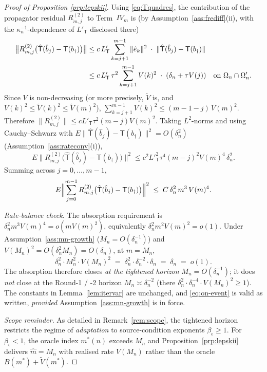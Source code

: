 \begin{proof}[Proof of Proposition \ref{prp:lepskii}]
Using \eqref{eq:Tquadres}, the contribution of the propagator residual
$R^{(2)}_{m,j}$ to Term~$IV_m$ is
(by Assumption~\ref{ass:frediff}\textup{(ii)}, with the
$\kappa_n^{-1}$-dependence of $L'_{\mathsf T}$ disclosed there)
\begin{align}
\bigl\|R^{(2)}_{m,j}\bigl(\hat{\mathsf T}(\hat b_j) - \mathsf T(b_\dagger)\bigr)\bigr\|
&\le c\,L'_{\mathsf T}\sum_{k=j+1}^{m-1}\|\hat e_k\|^{2}\;\cdot\;
   \|\hat{\mathsf T}(\hat b_j) - \mathsf T(b_\dagger)\|
   \notag\\
&\le c\,L'_{\mathsf T}\,\tau^{2}\sum_{k=j+1}^{m-1}V(k)^{2}\;\cdot\;
   (\delta_n + \tau V(j))
\quad\text{on $\Omega_n \cap \Omega'_n$.}
   \label{eq:Rabsorb-piece}
\end{align}
Since $V$ is non-decreasing (or more precisely, $\tilde V$ is, and
$V(k)^2 \le \tilde V(k)^2 \le \tilde V(m)^2$),
$\sum_{k=j+1}^{m-1}V(k)^{2} \le (m - 1 - j)\,V(m)^{2}$. Therefore
$\|R^{(2)}_{m,j}\| \le c L'_{\mathsf T}\tau^{2}(m-j)V(m)^{2}$. Taking
$L^{2}$-norms and using Cauchy--Schwarz with
$E\|\hat{\mathsf T}(\hat b_j) - \mathsf T(b_\dagger)\|^{2} = O(\delta_n^{2})$
(Assumption~\ref{ass:rateconv}\textup{(i)}),
\[
E\bigl\|R^{(2)}_{m,j}\bigl(\hat{\mathsf T}(\hat b_j) - \mathsf T(b_\dagger)\bigr)\bigr\|^{2}
\le c^{2}L'^{2}_{\mathsf T}\tau^{4}(m-j)^{2}V(m)^{4}\,\delta_n^{2}.
\]
Summing across $j = 0, \ldots, m-1$,
\begin{equation}\label{eq:Rabsorb-total}
E\Bigl\|\sum_{j=0}^{m-1}R^{(2)}_{m,j}\bigl(\hat{\mathsf T}(\hat b_j)
- \mathsf T(b_\dagger)\bigr)\Bigr\|^{2}
\;\le\; C\,\delta_n^{2}\,m^{3}\,V(m)^{4}.
\end{equation}

\emph{Rate-balance check.} The absorption requirement is
$\delta_n^{2}m^{3}V(m)^{4} = o(m V(m)^{2})$, equivalently
$\delta_n^{2}m^{2}V(m)^{2} = o(1)$. Under
Assumption~\ref{ass:mn-growth} ($M_n = O(\delta_n^{-1})$) and
$V(M_n)^{2} = O(\delta_n^{2}M_n) = O(\delta_n)$, at $m = M_n$,
\[
\delta_n^{2}\cdot M_n^{2}\cdot V(M_n)^{2}
\;=\; \delta_n^{2}\cdot \delta_n^{-2}\cdot \delta_n
\;=\; \delta_n
\;=\; o(1).
\]
The absorption therefore closes \emph{at the tightened horizon}
$M_n = O(\delta_n^{-1})$; it does \emph{not} close at the Round-1 / -2
horizon $M_n \asymp \delta_n^{-2}$ (there
$\delta_n^{2}\cdot\delta_n^{-4}\cdot V(M_n)^{2} \ge 1$). The constants
in Lemma~\ref{lem:itervar} are unchanged, and \eqref{eq:on-event} is
valid as written, \emph{provided}
Assumption~\ref{ass:mn-growth} is in force.

\emph{Scope reminder.} As detailed in Remark~\ref{rem:scope}, the
tightened horizon restricts the regime of \emph{adaptation} to
source-condition exponents $\beta_\epsilon \ge 1$. For
$\beta_\epsilon < 1$, the oracle index $m^{*}(n)$ exceeds $M_n$ and
Proposition~\ref{prp:lepskii} delivers $\hat m = M_n$ with realised
rate $V(M_n)$ rather than the oracle $B(m^*) + \tilde V(m^*)$.


\end{proof}
